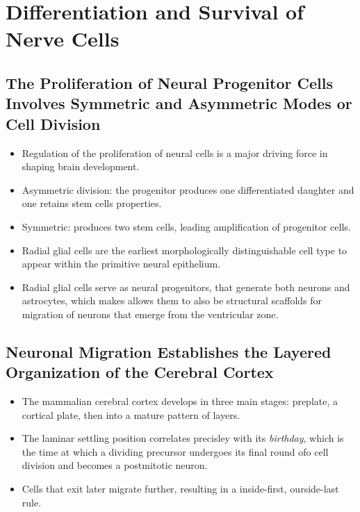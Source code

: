 \documentclass[12pt,a4paper]{article}
\begin{document}
\clearpage
\section{Differentiation and Survival of Nerve Cells}
\subsection{The Proliferation of Neural Progenitor Cells Involves Symmetric and Asymmetric Modes or Cell Division}
\begin{itemize}
    \item Regulation of the proliferation of neural cells is a major driving force in shaping brain development.
    \item Asymmetric division: the progenitor produces one differentiated daughter and one retains stem cells properties.
    \item Symmetric: produces two stem cells, leading amplification of progenitor cells.
    \item Radial glial cells are the earliest morphologically distinguishable cell type to appear within the primitive neural epithelium.
    \item Radial glial cells serve as neural progenitors, that generate both neurons and astrocytes, which makes allows them to also be structural scaffolds for migration of neurons that emerge from the ventricular zone.
\end{itemize}

\subsection{Neuronal Migration Establishes the Layered Organization of the Cerebral Cortex}
\begin{itemize}
    \item The mammalian cerebral cortex develops in three main stages: preplate, a cortical plate, then into a mature pattern of layers.
    \item The laminar settling position correlates precisley with its \textit{birthday}, which is the time at which a dividing precursor undergoes its final round ofo cell division and becomes a postmitotic neuron.
    \item Cells that exit later migrate further, resulting in a inside-first, ourside-last rule.
\end{itemize}
\end{document}
